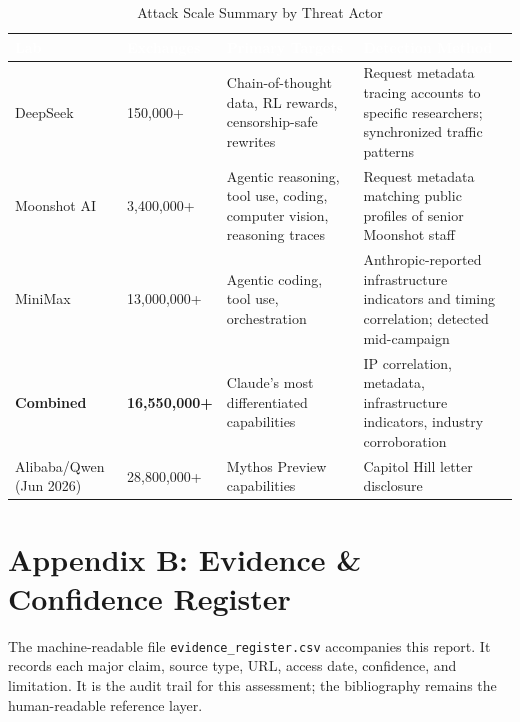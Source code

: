 \documentclass[11pt,a4paper]{article}
\begin{document}
\begin{table}[H]
\centering
\small
\renewcommand{\arraystretch}{1.3}
\begin{tabularx}{\textwidth}{|L{3cm}|L{2.5cm}|X|X|}
\hline
{}
\textcolor{white}{\textbf{Lab}} & \textcolor{white}{\textbf{Exchanges}} & \textcolor{white}{\textbf{Primary Targets}} & \textcolor{white}{\textbf{Detection Method}} \\
\hline
DeepSeek & 150,000+ & Chain-of-thought data, RL rewards, censorship-safe rewrites & Request metadata tracing accounts to specific researchers; synchronized traffic patterns \cite{anthropic_blog} \\
Moonshot AI & 3,400,000+ & Agentic reasoning, tool use, coding, computer vision, reasoning traces & Request metadata matching public profiles of senior Moonshot staff \cite{anthropic_blog} \\
MiniMax & 13,000,000+ & Agentic coding, tool use, orchestration & Anthropic-reported infrastructure indicators and timing correlation; detected mid-campaign \cite{anthropic_blog} \\
\textbf{Combined} & \textbf{16,550,000+} & Claude's most differentiated capabilities & IP correlation, metadata, infrastructure indicators, industry corroboration \cite{anthropic_blog} \\
Alibaba/Qwen (Jun 2026) & 28,800,000+ & Mythos Preview capabilities & Capitol Hill letter disclosure \cite{reuters_alibaba}\cite{forbes_distillation} \\
\hline
\end{tabularx}
\caption{Attack Scale Summary by Threat Actor}
\label{tab:scale_summary}
\end{table}

\newpage

\section*{Appendix B: Evidence \& Confidence Register}
\sloppy

The machine-readable file \texttt{evidence\_register.csv} accompanies this report. It records each major claim, source type, URL, access date, confidence, and limitation. It is the audit trail for this assessment; the bibliography remains the human-readable reference layer.
\end{document}

